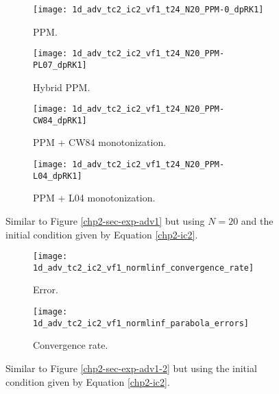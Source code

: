 \newpage

\begin{figure}[!htb]
  \centering
  \begin{subfigure}{0.49\textwidth}
    \centering
			\texttt{[image: 1d\_adv\_tc2\_ic2\_vf1\_t24\_N20\_PPM-0\_dpRK1]}
			\caption{PPM.\label{chp2-sec-exp-adv2-a}}
  \end{subfigure}
  \begin{subfigure}{0.49\textwidth}
    \centering
			\texttt{[image: 1d\_adv\_tc2\_ic2\_vf1\_t24\_N20\_PPM-PL07\_dpRK1]}
			\caption{Hybrid PPM.\label{chp2-sec-exp-adv2-b}}
  \end{subfigure}

  \begin{subfigure}{0.49\textwidth}
    \centering
		\texttt{[image: 1d\_adv\_tc2\_ic2\_vf1\_t24\_N20\_PPM-CW84\_dpRK1]}
    \caption{PPM + CW84 monotonization.\label{chp2-sec-exp-adv2-c}}
  \end{subfigure}
  \begin{subfigure}{0.49\textwidth}
    \centering
			\texttt{[image: 1d\_adv\_tc2\_ic2\_vf1\_t24\_N20\_PPM-L04\_dpRK1]}
      \caption{PPM + L04 monotonization.\label{chp2-sec-exp-adv2-d}}
  \end{subfigure} 
	\caption{ Similar to Figure \ref{chp2-sec-exp-adv1} but using $N=20$
	and the initial condition given by Equation \eqref{chp2-ic2}.\label{chp2-sec-exp-adv2}}
\end{figure}

\begin{figure}[!htb]
  \centering
  \begin{subfigure}{0.49\textwidth}
    \centering
		\texttt{[image: 1d\_adv\_tc2\_ic2\_vf1\_normlinf\_convergence\_rate]}
		\caption{Error.\label{chp2-sec-exp-adv2-error}}
  \end{subfigure}
  \begin{subfigure}{0.49\textwidth}
    \centering
			\texttt{[image: 1d\_adv\_tc2\_ic2\_vf1\_normlinf\_parabola\_errors]}
		\caption{Convergence rate.\label{chp2-sec-exp-adv2-CR}}
  \end{subfigure}
	\caption{ Similar to Figure \ref{chp2-sec-exp-adv1-2} but using
	the initial condition given by Equation \eqref{chp2-ic2}. \label{chp2-sec-exp-adv2-2}}
\end{figure}

\newpage

